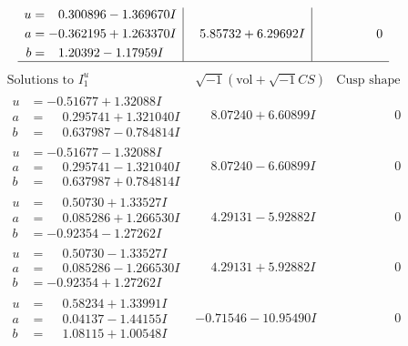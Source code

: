 \documentclass[1p]{elsarticle_modified}
\theoremstyle{definition}
\newcommand{\I}{\sqrt{-1}}
\begin{document}
$$\begin{array}{c|c|c}
\begin{aligned}
u &= \phantom{-}0.300896 - 1.369670 I \\
a &= -0.362195 + 1.263370 I \\
b &= \phantom{-}1.20392 - 1.17959 I\end{aligned}
 & \phantom{-}5.85732 + 6.29692 I & \phantom{-0.000000 } 0\\
 \hline 
 \end{array}$$\newpage$$\begin{array}{c|c|c}  
\text{Solutions to }I^u_{1}& \I (\text{vol} + \sqrt{-1}CS) & \text{Cusp shape}\\
 \hline 
\begin{aligned}
u &= -0.51677 + 1.32088 I \\
a &= \phantom{-}0.295741 + 1.321040 I \\
b &= \phantom{-}0.637987 - 0.784814 I\end{aligned}
 & \phantom{-}8.07240 + 6.60899 I & \phantom{-0.000000 } 0 \\ \hline\begin{aligned}
u &= -0.51677 - 1.32088 I \\
a &= \phantom{-}0.295741 - 1.321040 I \\
b &= \phantom{-}0.637987 + 0.784814 I\end{aligned}
 & \phantom{-}8.07240 - 6.60899 I & \phantom{-0.000000 } 0 \\ \hline\begin{aligned}
u &= \phantom{-}0.50730 + 1.33527 I \\
a &= \phantom{-}0.085286 + 1.266530 I \\
b &= -0.92354 - 1.27262 I\end{aligned}
 & \phantom{-}4.29131 - 5.92882 I & \phantom{-0.000000 } 0 \\ \hline\begin{aligned}
u &= \phantom{-}0.50730 - 1.33527 I \\
a &= \phantom{-}0.085286 - 1.266530 I \\
b &= -0.92354 + 1.27262 I\end{aligned}
 & \phantom{-}4.29131 + 5.92882 I & \phantom{-0.000000 } 0 \\ \hline\begin{aligned}
u &= \phantom{-}0.58234 + 1.33991 I \\
a &= \phantom{-}0.04137 - 1.44155 I \\
b &= \phantom{-}1.08115 + 1.00548 I\end{aligned}
 & -0.71546 - 10.95490 I & \phantom{-0.000000 } 0 \\ \hline\begin{aligned}

\end{aligned}
\end{array}$$
\end{document}
